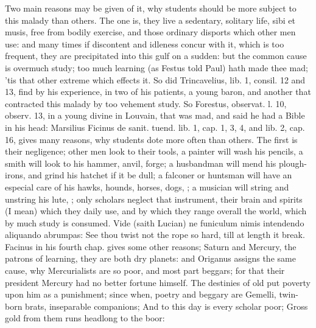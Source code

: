 {{Two main reasons may be given of it, why students should be more
subject to this malady than others. The one is, they live a sedentary,
solitary life, sibi et musis, free from bodily exercise, and those
ordinary disports which other men use: and many times if discontent and
idleness concur with it, which is too frequent, they are precipitated
into this gulf on a sudden: but the common cause is overmuch study; too
much learning (as Festus told Paul) hath made thee mad; 'tis that
other extreme which effects it. So did Trincavelius, lib. 1, consil. 12
and 13, find by his experience, in two of his patients, a young baron,
and another that contracted this malady by too vehement study. So
Forestus, observat. l. 10, observ. 13, in a young divine in Louvain,
that was mad, and said he had a Bible in his head: Marsilius
Ficinus de sanit. tuend. lib. 1, cap. 1, 3, 4, and lib. 2, cap. 16,
gives many reasons,  why students dote more often than others.
The first is their negligence; other men look to their tools, a
painter will wash his pencils, a smith will look to his hammer, anvil,
forge; a husbandman will mend his plough-irons, and grind his hatchet
if it be dull; a falconer or huntsman will have an especial care of his
hawks, hounds, horses, dogs, \etc{}; a musician will string and unstring
his lute, \etc{}; only scholars neglect that instrument, their brain and
spirits (I mean) which they daily use, and by which they range overall
the world, which by much study is consumed. Vide (saith Lucian) ne
funiculum nimis intendendo aliquando abrumpas: See thou twist not the
rope so hard, till at length it break. Facinus in his fourth
chap. gives some other reasons; Saturn and Mercury, the patrons of
learning, they are both dry planets: and Origanus assigns the same
cause, why Mercurialists are so poor, and most part beggars; for that
their president Mercury had no better fortune himself. The destinies of
old put poverty upon him as a punishment; since when, poetry and
beggary are Gemelli, twin-born brats, inseparable companions;
And to this day is every scholar poor;
Gross gold from them runs headlong to the boor:

}}
